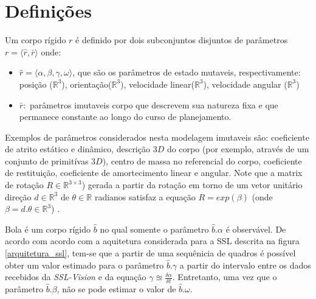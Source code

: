 \section{Definições}

\begin{defi}
  Um corpo rígido $r$ é definido por dois subconjuntos disjuntos
  de parâmetros $r= \langle \hat{r}, \bar{r} \rangle$ onde:
  \begin{itemize}
    \item $\hat{r} = \langle \alpha, \beta, \gamma, \omega \rangle$,
    que são os parâmetros de estado mutaveis, respectivamente:
    posição ($\mathbb{R} ^{3}$), orientação($\mathbb{R} ^{3}$),
    velocidade linear($\mathbb{R} ^{3}$), velocidade angular
    ($\mathbb{R} ^{3}$)
    
    \item $\bar{r} :$ parâmetros imutaveis corpo que descrevem sua
    natureza fixa e que permanece constante ao longo do curso de 
    planejamento.
  \end{itemize}
  
  Exemplos de parâmetros considerados nesta modelagem imutaveis são:
  coeficiente de atrito estático e dinâmico, descrição $3D$ do corpo
  (por exemplo, através de um conjunto de primitívas $3D$), centro de
  massa no referencial do corpo, coeficiente de restituição,
  coeficiente de amortecimento linear e angular. Note que a matrix de
  rotação $R\in\mathbb{R}^{3\times 3}$) gerada a partir da rotação
  em torno de um vetor unitário direção $d\in\mathbb{R}^{3}$  de
  $\theta \in \mathbb{R}$ radianos satisfaz a equação
  $R = exp\left( \beta \right)$ (onde $\beta = d. \theta \in \mathbb{R} ^{3}$)
  \cite{math2robotics}.
\end{defi}

\begin{defi}[Bola]\label{def:bola}
  Bola é um corpo rígido $\hat{b}$ no qual somente o parâmetro
  $\hat{b}.\alpha$ é observável. De acordo com acordo com a
  aquitetura considerada para a SSL descrita na figura
  \ref{arquitetura_ssl}, tem-se que a partir de uma sequênicia
  de quadros é possível obter um valor estimado para o parâmetro
  $\hat{b}.\gamma$ a partir do intervalo entre os dados recebidos
  da \textit{SSL-Vision} e da equação $ \gamma \approxeq 
  \frac{\delta \alpha}{\delta t} $. Entretanto, uma vez que o
  parâmetro $\hat{b}.\beta$, não se pode estimar o valor de
  $\hat{b}.\omega$.
\end{defi}

